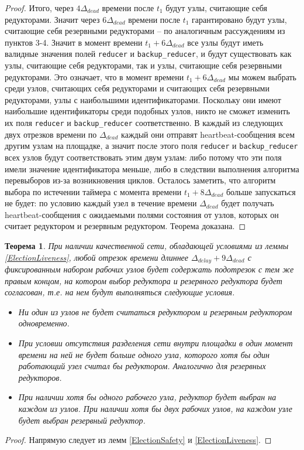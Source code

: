 \documentclass{article}
\theoremstyle{plain}
\newtheorem{theorem}{Теорема}[section]
\theoremstyle{plain}
\theoremstyle{plain}
\theoremstyle{plain}
\theoremstyle{definition}
\theoremstyle{remark}
\theoremstyle{plain}
\begin{document}
\begin{proof}
    Итого, через $4\Delta_{dead}$ времени после $t_1$ будут узлы, считающие себя редукторами. Значит через $6\Delta_{dead}$ времени после $t_1$ гарантировано будут узлы, считающие себя резервными редукторами -- по аналогичным рассуждениям из пунктов 3-4. Значит в момент времени $t_1 + 6\Delta_{dead}$ все узлы будут иметь валидные значения полей \texttt{reducer} и \texttt{backup\_reducer}, и будут существовать как узлы, считающие себя редукторами, так и узлы, считающие себя резервными редукторами. Это означает, что в момент времени $t_1 + 6\Delta_{dead}$ мы можем выбрать среди узлов, считающих себя редукторами и считающих себя резервными редукторами, узлы с наибольшими идентификаторами. Поскольку они имеют наибольшие идентификаторы среди подобных узлов, никто не сможет изменить их поля \texttt{reducer} и \texttt{backup\_reducer} соответственно. В каждый из следующих двух отрезков времени по $\Delta_{dead}$ каждый они отправят heartbeat-сообщения всем другим узлам на площадке, а значит после этого поля \texttt{reducer} и \texttt{backup\_reducer} всех узлов будут соответствовать этим двум узлам: либо потому что эти поля имели значение идентификатора меньше, либо в следствии выполнения алгоритма перевыборов из-за возникновения циклов. Осталось заметить, что алгоритм выбора по истечении таймера с момента времени $t_1 + 8\Delta_{dead}$ больше запускаться не будет: по условию каждый узел в течение времени $\Delta_{dead}$ будет получать heartbeat-сообщения с ожидаемыми полями состояния от узлов, которых он считает редуктором и резервным редуктором. Теорема доказана.
\end{proof}

\begin{theorem}
\label{ElectionEC}
    При наличии качественной сети, обладающей условиями из леммы \ref{ElectionLiveness}, любой отрезок времени длиннее $\Delta_{delay} + 9\Delta_{dead}$ с фиксированным набором рабочих узлов будет содержать подотрезок с тем же правым концом, на котором выбор редуктора и резервного редуктора будет согласован, т.е. на нем будут выполняться следующие условия.
    
    \begin{itemize}
        \item Ни один из узлов не будет считаться редуктором и резервным редуктором одновременно.
    
        \item При условии отсутствия разделения сети внутри площадки в один момент времени на ней не будет больше одного узла, которого хотя бы один работающий узел считал бы редуктором. Аналогично для резервных редукторов.
        
        \item При наличии хотя бы одного рабочего узла, редуктор будет выбран на каждом из узлов. При наличии хотя бы двух рабочих узлов, на каждом узле будет выбран резервный редуктор.
    \end{itemize}
\end{theorem}
\begin{proof}
    Напрямую следует из лемм \ref{ElectionSafety} и \ref{ElectionLiveness}.
\end{proof}
\end{document}
